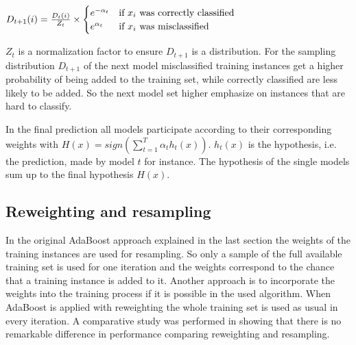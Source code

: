 \documentclass[10pt]{reportMaster}
\begin{document}
$ D_{t+1}(i) = \frac{D_t(i)}{Z_t} \times 
\begin{cases}
	e^{-\alpha_t} & \text{if $ x_i $ was correctly classified} \\ 
	e^{\alpha_t} & \text{if $ x_i $ was misclassified}
\end{cases}
$

$Z_t$ is a normalization factor to ensure $D_{t+1}$ is a distribution.
For the sampling distribution $D_{t+1}$ of the next model misclassified training instances get a higher probability of being added to the training set, while correctly classified are less likely to be added.
So the next model set higher emphasize on instances that are hard to classify.

In the final prediction all models participate according to their corresponding weights with $H(x) = sign(\sum_{t = 1}^T\alpha_th_t(x))$.
$h_t(x)$ is the hypothesis, i.e. the prediction, made by model $t$ for instance.
The hypothesis of the single models sum up to the final hypothesis $H(x)$. 


\subsection{Reweighting and resampling}
\label{sec:reweightingResampling}
In the original AdaBoost approach explained in the last section the weights of the training instances are used for resampling.
So only a sample of the full available training set is used for one iteration and the weights correspond to the chance that a training instance is added to it.
Another approach is to incorporate the weights into the training process if it is possible in the used algorithm.
When AdaBoost is applied with reweighting the whole training set is used as usual in every iteration.
A comparative study was performed in \cite{resamplingReweighting} showing that there is no remarkable difference in performance comparing reweighting and resampling.
\end{document}
